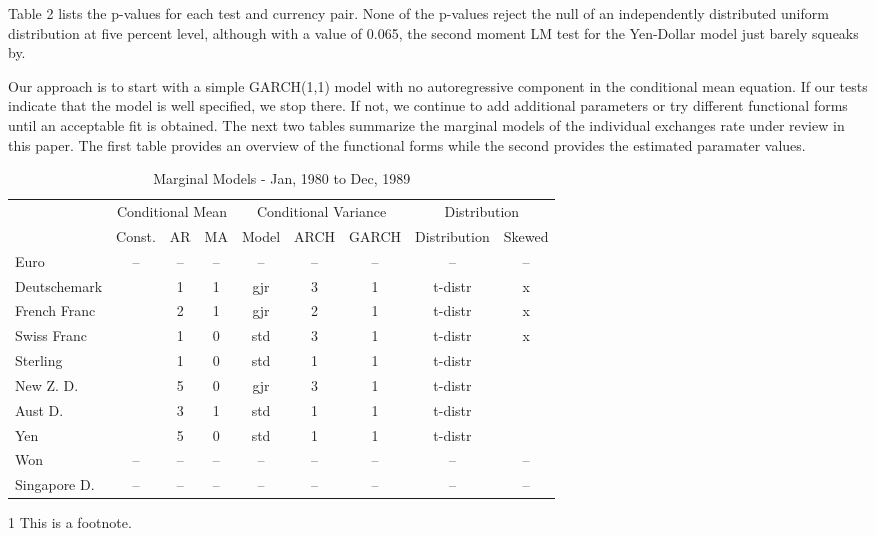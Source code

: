 \documentclass[12pt]{article}
\begin{document}
Table 2 lists the p-values for each test and currency pair. None of the p-values reject the null of an independently distributed uniform distribution at five percent level, although with a value of 0.065, the second moment LM test for the Yen-Dollar model just barely squeaks by.


Our approach is to start with a simple GARCH(1,1) model with no autoregressive component in the conditional mean equation. If our tests indicate that the model is well specified, we stop there. If not, we continue to add additional parameters or try different functional forms until an acceptable fit is obtained. The next two tables summarize the marginal models of the individual exchanges rate under review in this paper. The first table provides an overview of the functional forms while the second provides the estimated paramater values.

\vspace{10mm}

\begin{table}
	\caption{Marginal Models - Jan, 1980 to Dec, 1989}
	\begin{threeparttable}
		\begin{tabular}[l]{l c c c c c c c c}
	    \hline
	& \multicolumn{3}{c}{Conditional Mean}  & \multicolumn{3}{c}{Conditional Variance}  & \multicolumn{2}{c}{Distribution} \\
			            & Const.     & AR & MA & Model & ARCH & GARCH & Distribution & Skewed     \\
	\hline
	    Euro            & --         & -- & -- & --    & --   & --    & --           & --         \\
		Deutschemark    & \checkmark & 1  & 1  & gjr   & 3    & 1     & t-distr      & x          \\
		French Franc    & \checkmark & 2  & 1  & gjr   & 2    & 1     & t-distr      & x          \\
		Swiss Franc     & \checkmark & 1  & 0  & std   & 3    & 1     & t-distr      & x          \\
		Sterling        & \checkmark & 1  & 0  & std   & 1    & 1     & t-distr      & \checkmark \\
		New Z. D.       & \checkmark & 5  & 0  & gjr   & 3    & 1     & t-distr      & \checkmark \\
		Aust D.         & \checkmark & 3  & 1  & std   & 1    & 1     & t-distr      & \checkmark \\
		Yen             & \checkmark & 5  & 0  & std   & 1    & 1     & t-distr      & \checkmark \\
		Won             & --         & -- & -- & --    & --   & --    & --           & --         \\
		Singapore D.    & --         & -- & -- & --    & --   & --    & --           & --         \\
	\hline
		\end{tabular}
		\begin{tablenotes}
			\item[1]{\footnotesize This is a footnote.}
		\end{tablenotes}
	\end{threeparttable}
\end{table}
\end{document}
